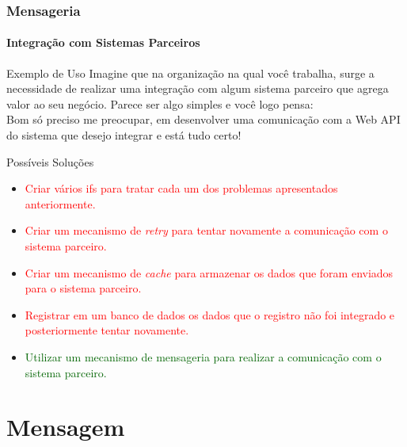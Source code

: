\documentclass[
	9pt, %
	t, %
]{beamer}
\begin{document}
\begin{frame}
	\frametitle{Mensageria}
	\framesubtitle{Integração com Sistemas Parceiros}

	\begin{block}{Exemplo de Uso}
		Imagine que na organização na qual você trabalha, surge a necessidade de realizar uma integração com algum sistema parceiro que agrega valor ao seu negócio. Parece ser algo simples e você logo pensa:
		\\ \bigskip
		\alert{Bom só preciso me preocupar, em desenvolver uma comunicação com a Web API do sistema que desejo integrar e está tudo certo!}

	\end{block}

	\begin{exampleblock}{Possíveis Soluções}
		\begin{itemize}
			\item \textcolor{red}{Criar vários ifs para tratar cada um dos problemas apresentados anteriormente.}
			\item \textcolor{red}{Criar um mecanismo de \textit{retry} para tentar novamente a comunicação com o sistema parceiro.}
			\item \textcolor{red}{Criar um mecanismo de \textit{cache} para armazenar os dados que foram enviados para o sistema parceiro.}
			\item \textcolor{red}{Registrar em um banco de dados os dados que o registro não foi integrado e posteriormente tentar novamente.}
			\item \textcolor{darkgreen}{Utilizar um mecanismo de mensageria para realizar a comunicação com o sistema parceiro.}
		\end{itemize}
	\end{exampleblock}

\end{frame}

\section{Mensagem}
\end{document}
